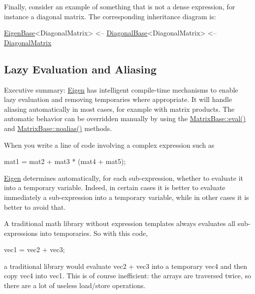 Finally, consider an example of something that is not a dense expression, for instance a diagonal matrix. The corresponding inheritance diagram is\+:


\begin{DoxyPre}
\hyperlink{group___core___module_struct_eigen_1_1_eigen_base}{EigenBase}<DiagonalMatrix>
  <-- \hyperlink{class_eigen_1_1_diagonal_base}{DiagonalBase}<DiagonalMatrix>
    <-- \hyperlink{group___core___module_class_eigen_1_1_diagonal_matrix}{DiagonalMatrix}
\end{DoxyPre}
 \hypertarget{TopicLazyEvaluation}{}\subsection{Lazy Evaluation and Aliasing}\label{TopicLazyEvaluation}
Executive summary\+: \hyperlink{namespace_eigen}{Eigen} has intelligent compile-\/time mechanisms to enable lazy evaluation and removing temporaries where appropriate. It will handle aliasing automatically in most cases, for example with matrix products. The automatic behavior can be overridden manually by using the \hyperlink{group___core___module_a5df64c66228ba75bbc66db2584185527}{Matrix\+Base\+::eval()} and \hyperlink{group___core___module_a2c1085de7645f23f240876388457da0b}{Matrix\+Base\+::noalias()} methods.

When you write a line of code involving a complex expression such as


\begin{DoxyCode}
mat1 = mat2 + mat3 * (mat4 + mat5); 
\end{DoxyCode}


\hyperlink{namespace_eigen}{Eigen} determines automatically, for each sub-\/expression, whether to evaluate it into a temporary variable. Indeed, in certain cases it is better to evaluate immediately a sub-\/expression into a temporary variable, while in other cases it is better to avoid that.

A traditional math library without expression templates always evaluates all sub-\/expressions into temporaries. So with this code,


\begin{DoxyCode}
vec1 = vec2 + vec3; 
\end{DoxyCode}


a traditional library would evaluate {\ttfamily vec2} + vec3 into a temporary {\ttfamily vec4} and then copy {\ttfamily vec4} into {\ttfamily vec1}. This is of course inefficient\+: the arrays are traversed twice, so there are a lot of useless load/store operations.

